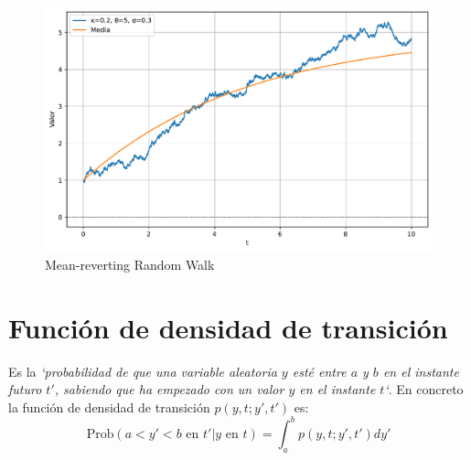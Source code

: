 \begin{itemize}
    \begin{figure}[H]
        \centering
        \includegraphics[width=0.65\linewidth]{Imagenes/Parte1/3_Aleatoriedad/MeanRevertingWalk.pdf}
        \caption{Mean-reverting Random Walk}
    \end{figure}
\end{itemize}



\section{Función de densidad de transición}
Es la \textit{`probabilidad de que una variable aleatoria $y$ esté entre $a$ y $b$ en el instante futuro $t'$, sabiendo que ha empezado con un valor $y$ en el instante $t$`}. En concreto la función de densidad de transición $p(y, t; y', t')$ es:
\[
    \boxed{\text{Prob}(a<y'<b\text{ en }t' | y\text{ en }t) = \int_a^b p(y, t; y', t') dy'}
\]

